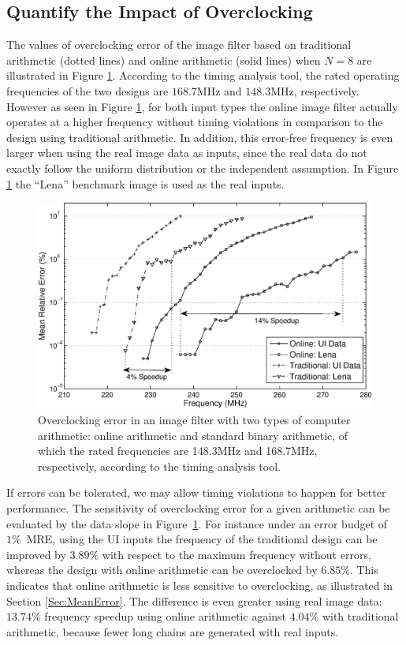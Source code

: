 \documentclass{acm_proc_article-sp}
\begin{document}
\subsection{Quantify the Impact of Overclocking}
The values of overclocking error of the image filter based on traditional arithmetic (dotted lines) and online arithmetic (solid lines) when $N=8$ are illustrated in Figure \ref{Fig:MRE_ImageFilter}. According to the timing analysis tool, the rated operating frequencies of the two designs are $168.7$MHz and $148.3$MHz, respectively. However as seen in Figure \ref{Fig:MRE_ImageFilter}, for both input types the online image filter actually operates at a higher frequency without timing violations in comparison to the design using traditional arithmetic. In addition, this error-free frequency is even larger when using the real image data as inputs, since the real data do not exactly follow the uniform distribution or the independent assumption. In Figure \ref{Fig:MRE_ImageFilter} the ``Lena'' benchmark image is used as the real inputs.
%
\begin{figure}
    \centering
    \includegraphics[width=.48\textwidth]{./Figures/MRE.eps}
    \vspace{-4ex}
    \caption{Overclocking error in an image filter with two types of computer arithmetic: online arithmetic and standard binary arithmetic, of which the rated frequencies are 148.3MHz and 168.7MHz, respectively, according to the timing analysis tool.}
    \label{Fig:MRE_ImageFilter}
    \vspace{-2ex}
\end{figure}

\vspace{-1ex}
If errors can be tolerated, we may allow timing violations to happen for better performance. The sensitivity of overclocking error for a given arithmetic can be evaluated by the data slope in Figure~\ref{Fig:MRE_ImageFilter}. For instance under an error budget of $1\%$~MRE, using the UI inputs the frequency of the traditional design can be improved by $3.89\%$ with respect to the maximum frequency without errors, whereas the design with online arithmetic can be overclocked by $6.85\%$. This indicates that online arithmetic is less sensitive to overclocking, as illustrated in Section \ref{Sec:MeanError}. The difference is even greater using real image data: $13.74\%$ frequency speedup using online arithmetic against $4.04\%$ with traditional arithmetic, because fewer long chains are generated with real inputs.\vspace{-1ex}
\end{document}
